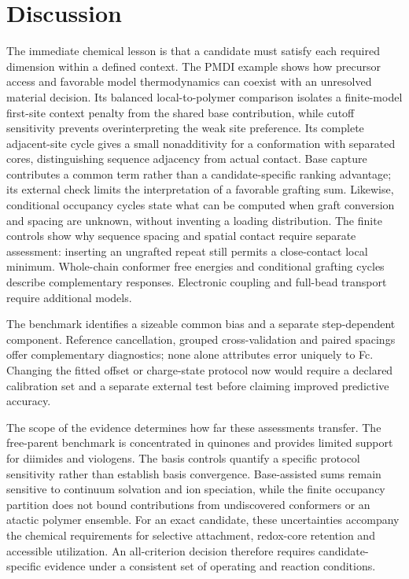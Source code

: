 \documentclass[11pt]{article}
\begin{document}
\FloatBarrier
\section{Discussion}
The immediate chemical lesson is that a candidate must satisfy each required dimension within a defined context. The PMDI example shows how precursor access and favorable model thermodynamics can coexist with an unresolved material decision. Its balanced local-to-polymer comparison isolates a finite-model first-site context penalty from the shared base contribution, while cutoff sensitivity prevents overinterpreting the weak site preference. Its complete adjacent-site cycle gives a small nonadditivity for a conformation with separated cores, distinguishing sequence adjacency from actual contact. Base capture contributes a common term rather than a candidate-specific ranking advantage; its external check limits the interpretation of a favorable grafting sum. Likewise, conditional occupancy cycles state what can be computed when graft conversion and spacing are unknown, without inventing a loading distribution. The finite controls show why sequence spacing and spatial contact require separate assessment: inserting an ungrafted repeat still permits a close-contact local minimum. Whole-chain conformer free energies and conditional grafting cycles describe complementary responses. Electronic coupling and full-bead transport require additional models.

The benchmark identifies a sizeable common bias and a separate step-dependent component. Reference cancellation, grouped cross-validation and paired spacings offer complementary diagnostics; none alone attributes error uniquely to Fc. Changing the fitted offset or charge-state protocol now would require a declared calibration set and a separate external test before claiming improved predictive accuracy.

The scope of the evidence determines how far these assessments transfer. The free-parent benchmark is concentrated in quinones and provides limited support for diimides and viologens. The basis controls quantify a specific protocol sensitivity rather than establish basis convergence. Base-assisted sums remain sensitive to continuum solvation and ion speciation, while the finite occupancy partition does not bound contributions from undiscovered conformers or an atactic polymer ensemble. For an exact candidate, these uncertainties accompany the chemical requirements for selective attachment, redox-core retention and accessible utilization. An all-criterion decision therefore requires candidate-specific evidence under a consistent set of operating and reaction conditions.
\end{document}
